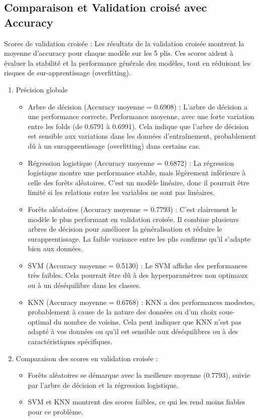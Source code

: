 \subsection{Comparaison et Validation croisé avec Accuracy}
\begin{flushleft}
Scores de validation croisée :
Les résultats de la validation croisée montrent la moyenne d'accuracy pour chaque modèle sur les 5 plis. Ces scores aident à évaluer la stabilité et la performance générale des modèles, tout en réduisant les risques de sur-apprentissage (overfitting).
\end{flushleft} 
\begin{enumerate}
\item Précision globale
\begin{itemize}
\item Arbre de décision (Accuracy moyenne = 0.6908) : L'arbre de décision a une performance correcte.
Performance moyenne, avec une forte variation entre les folds (de 0.6791 à 0.6991). Cela indique que l’arbre de décision est sensible aux variations dans les données d’entraînement, probablement dû à un surapprentissage (overfitting) dans certains cas.
\item Régression logistique (Accuracy moyenne = 0.6872) : La régression logistique montre une performance stable, mais légèrement inférieure à celle des forêts aléatoires.  C'est un modèle linéaire, donc il pourrait être limité si les relations entre les variables ne sont pas linéaires.
\item Forêts aléatoires (Accuracy moyenne = 0.7793) :
C'est clairement le modèle le plus performant en validation croisée. Il combine plusieurs arbres de décision pour améliorer la généralisation et réduire le surapprentissage. La faible variance entre les plis confirme qu'il s'adapte bien aux données.
\item SVM (Accuracy moyenne = 0.5130) : Le SVM affiche des performances très faibles.
Cela pourrait être dû à des hyperparamètres non optimaux ou à un déséquilibre dans les classes.
\item KNN (Accuracy moyenne = 0.6768) : KNN a des performances modestes, probablement à cause de la nature des données ou d'un choix sous-optimal du nombre de voisins. Cela peut indiquer que KNN n'est pas adapté à vos données ou qu'il est sensible aux déséquilibres ou à des caractéristiques spécifiques.
\end{itemize}

\item Comparaison des scores en validation croisée :
\begin{itemize}
\item Forêts aléatoires se démarque avec la meilleure moyenne (0.7793), suivie par l'arbre de décision et la régression logistique.
\item SVM et KNN montrent des scores faibles, ce qui les rend moins fiables pour ce problème.


\end{itemize}
\end{enumerate}
